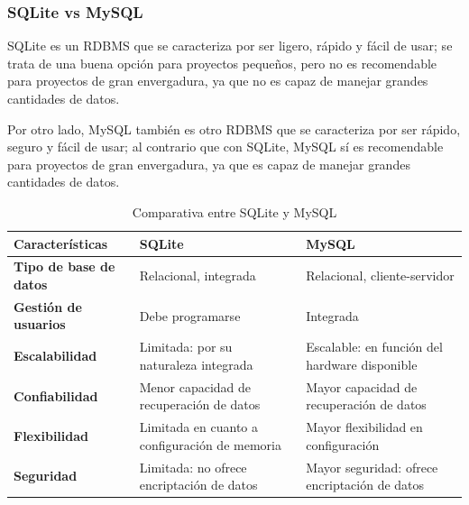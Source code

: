             \subsubsection{SQLite vs MySQL}

                SQLite es un RDBMS \cite{sqlite} que se caracteriza por ser ligero, rápido y fácil de usar; se trata de una buena opción para proyectos pequeños, pero no es recomendable para proyectos de gran envergadura, ya que no es capaz de manejar grandes cantidades de datos.
                
                Por otro lado, MySQL también es otro RDBMS \cite{mysql} que se caracteriza por ser rápido, seguro y fácil de usar; al contrario que con SQLite, MySQL sí es recomendable para proyectos de gran envergadura, ya que es capaz de manejar grandes cantidades de datos.

                \begin{table}[h]
                    \centering
                    
                    \begin{tabular}{|>{\centering\arraybackslash}m{4cm}|>{\centering\arraybackslash}m{5cm}|>{\centering\arraybackslash}m{5cm}|}
                        \hline
                        \textbf{Características} & \textbf{SQLite} & \textbf{MySQL} \\
                        \hline
                        \hline
                        \textbf{Tipo de base de datos} & Relacional, integrada & Relacional, cliente-servidor \\
                        \hline
                        \textbf{Gestión de usuarios} & Debe programarse & Integrada \\
                        \hline
                        \textbf{Escalabilidad} & Limitada: por su naturaleza integrada & Escalable: en función del hardware disponible \\
                        \hline
                        \textbf{Confiabilidad} & Menor capacidad de recuperación de datos & Mayor capacidad de recuperación de datos \\
                        \hline
                        \textbf{Flexibilidad} & Limitada en cuanto a configuración de memoria & Mayor flexibilidad en configuración \\
                        \hline
                        \textbf{Seguridad} & Limitada: no ofrece encriptación de datos & Mayor seguridad: ofrece encriptación de datos \\
                        \hline
                    \end{tabular}
                        
                    \caption{Comparativa entre SQLite y MySQL}
                    \label{tabla:mysql-vs-sqlite}
                \end{table}

